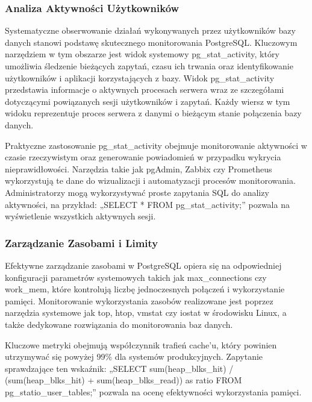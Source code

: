 \documentclass[letterpaper,10pt,polish]{sphinxmanual}
\begin{document}
\subsubsection{Analiza Aktywności      Użytkowników}
\label{\detokenize{rozdzial2/repo-wspolne/index:analiza-aktywnosci-uzytkownikow}}
\sphinxAtStartPar
Systematyczne obserwowanie działań wykonywanych przez użytkowników bazy danych stanowi podstawę skutecznego monitorowania PostgreSQL. Kluczowym narzędziem w tym obszarze jest widok systemowy pg\_stat\_activity, który umożliwia śledzenie bieżących zapytań, czasu ich trwania oraz identyfikowanie użytkowników i aplikacji korzystających z bazy. Widok pg\_stat\_activity przedstawia informacje o aktywnych procesach serwera wraz ze szczegółami dotyczącymi powiązanych sesji użytkowników i zapytań. Każdy wiersz w tym widoku reprezentuje proces serwera z danymi o bieżącym stanie połączenia bazy danych.

\sphinxAtStartPar
Praktyczne zastosowanie pg\_stat\_activity obejmuje monitorowanie aktywności w czasie rzeczywistym oraz generowanie powiadomień w przypadku wykrycia nieprawidłowości. Narzędzia takie jak pgAdmin, Zabbix czy Prometheus wykorzystują te dane do wizualizacji i automatyzacji procesów monitorowania. Administratorzy mogą wykorzystywać proste zapytania SQL do analizy aktywności, na przykład: „SELECT * FROM pg\_stat\_activity;” pozwala na wyświetlenie wszystkich aktywnych sesji.


\subsubsection{Zarządzanie     Zasobami        i       Limity}
\label{\detokenize{rozdzial2/repo-wspolne/index:zarzadzanie-zasobami-i-limity}}
\sphinxAtStartPar
Efektywne zarządzanie zasobami w PostgreSQL opiera się na odpowiedniej konfiguracji parametrów systemowych takich jak max\_connections czy work\_mem, które kontrolują liczbę jednoczesnych połączeń i wykorzystanie pamięci. Monitorowanie wykorzystania zasobów realizowane jest poprzez narzędzia systemowe jak top, htop, vmstat czy iostat w środowisku Linux, a także dedykowane rozwiązania do monitorowania baz danych.

\sphinxAtStartPar
Kluczowe metryki obejmują współczynnik trafień cache’u, który powinien utrzymywać się powyżej 99\% dla systemów produkcyjnych. Zapytanie sprawdzające ten wskaźnik: „SELECT sum(heap\_blks\_hit) / (sum(heap\_blks\_hit) + sum(heap\_blks\_read)) as ratio FROM pg\_statio\_user\_tables;” pozwala na ocenę efektywności wykorzystania pamięci.
\end{document}

